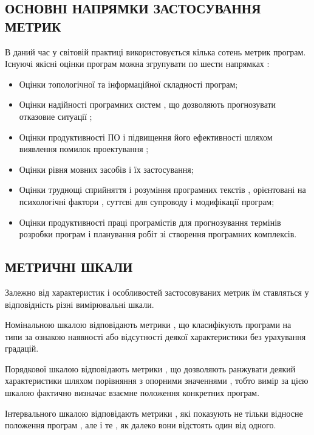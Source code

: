 \documentclass[oneside,final,14pt]{extreport}
\begin{document}
\subsection{ОСНОВНІ НАПРЯМКИ ЗАСТОСУВАННЯ МЕТРИК}
\label{2section:id4}
В даний час у світовій практиці використовується кілька сотень метрик програм. Існуючі якісні оцінки програм можна згрупувати по шести напрямках :
\begin{itemize}
\item {} 
Оцінки топологічної та інформаційної складності програм;

\item {} 
Оцінки надійності програмних систем , що дозволяють прогнозувати отказовие ситуації ;

\item {} 
Оцінки продуктивності ПО і підвищення його ефективності шляхом виявлення помилок проектування ;

\item {} 
Оцінки рівня мовних засобів і їх застосування;

\item {} 
Оцінки труднощі сприйняття і розуміння програмних текстів , орієнтовані на психологічні фактори , суттєві для супроводу і модифікації програм;

\item {} 
Оцінки продуктивності праці програмістів для прогнозування термінів розробки програм і планування робіт зі створення програмних комплексів.

\end{itemize}


\subsection{МЕТРИЧНІ ШКАЛИ}
\label{2section:id5}
Залежно від характеристик і особливостей застосовуваних метрик їм ставляться у відповідність різні вимірювальні шкали.

Номінальною шкалою відповідають метрики , що класифікують програми на типи за ознакою наявності або відсутності деякої характеристики без урахування градацій.

Порядкової шкалою відповідають метрики , що дозволяють ранжувати деякий характеристики шляхом порівняння з опорними значеннями , тобто вимір за цією шкалою фактично визначає взаємне положення конкретних програм.

Інтервального шкалою відповідають метрики , які показують не тільки відносне положення програм , але і те , як далеко вони відстоять один від одного.
\end{document}
